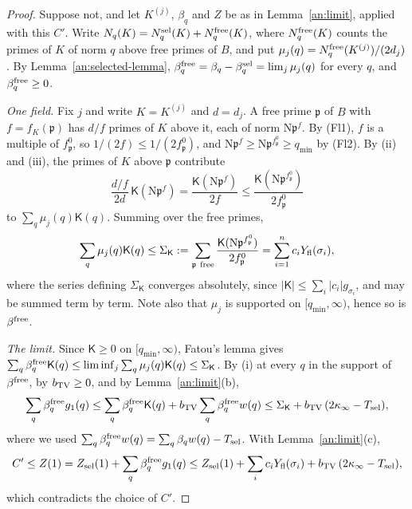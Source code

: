 \begin{proof}
Suppose not, and let $K^{(j)}$, $\beta_q$ and $Z$ be as in
Lemma~\ref{an:limit}, applied with this $C'$. Write
$N_q(K)=N^{\rm sel}_q(K)+N^{\rm free}_q(K)$, where $N^{\rm free}_q(K)$
counts the primes of $K$ of norm $q$ above free primes of $B$, and put
$\mu_j(q)=N^{\rm free}_q(K^{(j)})/(2d_j)$. By Lemma~\ref{an:selected-lemma},
$\beta^{\rm free}_q=\beta_q-\beta^{\rm sel}_q=\lim_j\mu_j(q)$ for every $q$,
and $\beta^{\rm free}_q\ge0$.

\emph{One field.} Fix $j$ and write $K=K^{(j)}$ and $d=d_j$. A free prime
$\mathfrak p$ of $B$ with $f=f_K(\mathfrak p)$ has $d/f$ primes of $K$ above
it, each of norm $\mathrm N\mathfrak p^f$. By (Fl1), $f$ is a multiple of
$f^0_{\mathfrak p}$, so $1/(2f)\le1/(2f^0_{\mathfrak p})$, and
$\mathrm N\mathfrak p^f\ge\mathrm N\mathfrak p^{f^0_{\mathfrak p}}\ge q_{\min}$
by (Fl2). By (ii) and (iii), the primes of $K$ above $\mathfrak p$ contribute
\[
 \frac{d/f}{2d}\,\mathsf K(\mathrm N\mathfrak p^f)
 =\frac{\mathsf K(\mathrm N\mathfrak p^f)}{2f}
 \le\frac{\mathsf K(\mathrm N\mathfrak p^{f^0_{\mathfrak p}})}{2f^0_{\mathfrak p}}
\]
to $\sum_q\mu_j(q)\mathsf K(q)$. Summing over the free primes,
\[
 \sum_q\mu_j(q)\mathsf K(q)\le\Sigma_{\mathsf K}:=\sum_{\mathfrak p\ \rm free}
 \frac{\mathsf K(\mathrm N\mathfrak p^{f^0_{\mathfrak p}})}{2f^0_{\mathfrak p}}
 =\sum_{i=1}^nc_iY_{\rm fl}(\sigma_i),
\]
where the series defining $\Sigma_{\mathsf K}$ converges absolutely, since
$|\mathsf K|\le\sum_i|c_i|g_{\sigma_i}$, and may be summed term by term. Note
also that $\mu_j$ is supported on $[q_{\min},\infty)$, hence so is
$\beta^{\rm free}$.

\emph{The limit.} Since $\mathsf K\ge0$ on $[q_{\min},\infty)$, Fatou's
lemma gives $\sum_q\beta^{\rm free}_q\mathsf K(q)\le\liminf_j\sum_q\mu_j(q)
\mathsf K(q)\le\Sigma_{\mathsf K}$. By (i) at every $q$ in the support of
$\beta^{\rm free}$, by $b_{\rm TV}\ge0$, and by Lemma~\ref{an:limit}(b),
\[
 \sum_q\beta^{\rm free}_qg_1(q)
 \le\sum_q\beta^{\rm free}_q\mathsf K(q)
 +b_{\rm TV}\sum_q\beta^{\rm free}_qw(q)
 \le\Sigma_{\mathsf K}+b_{\rm TV}\,(2\kappa_\infty-T_{\rm sel}),
\]
where we used $\sum_q\beta^{\rm free}_qw(q)=\sum_q\beta_qw(q)-T_{\rm sel}$.
With Lemma~\ref{an:limit}(c),
\[
 C'\le Z(1)=Z_{\rm sel}(1)+\sum_q\beta^{\rm free}_qg_1(q)
 \le Z_{\rm sel}(1)+\sum_ic_iY_{\rm fl}(\sigma_i)
 +b_{\rm TV}\,(2\kappa_\infty-T_{\rm sel}),
\]
which contradicts the choice of $C'$.
\end{proof}

